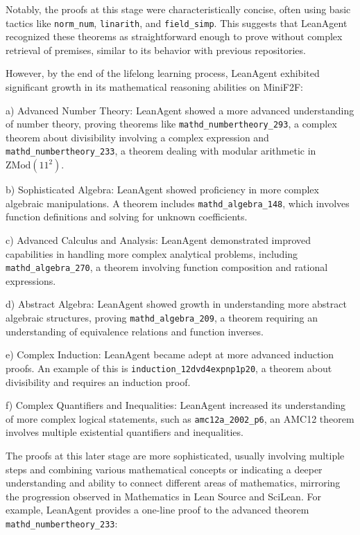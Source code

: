 \documentclass{article} %
\begin{document}
Notably, the proofs at this stage were characteristically concise, often using basic tactics like \texttt{norm\_num}, \texttt{linarith}, and \texttt{field\_simp}. This suggests that LeanAgent recognized these theorems as straightforward enough to prove without complex retrieval of premises, similar to its behavior with previous repositories.

However, by the end of the lifelong learning process, LeanAgent exhibited significant growth in its mathematical reasoning abilities on MiniF2F:

a) Advanced Number Theory:
LeanAgent showed a more advanced understanding of number theory, proving theorems like \texttt{mathd\_numbertheory\_293}, a complex theorem about divisibility involving a complex expression and \texttt{mathd\_numbertheory\_233}, a theorem dealing with modular arithmetic in $\text{ZMod}(11^2)$.

b) Sophisticated Algebra:
LeanAgent showed proficiency in more complex algebraic manipulations. A theorem includes \texttt{mathd\_algebra\_148}, which involves function definitions and solving for unknown coefficients.

c) Advanced Calculus and Analysis:
LeanAgent demonstrated improved capabilities in handling more complex analytical problems, including \texttt{mathd\_algebra\_270}, a theorem involving function composition and rational expressions.

d) Abstract Algebra:
LeanAgent showed growth in understanding more abstract algebraic structures, proving \texttt{mathd\_algebra\_209}, a theorem requiring an understanding of equivalence relations and function inverses.

e) Complex Induction:
LeanAgent became adept at more advanced induction proofs. An example of this is \texttt{induction\_12dvd4expnp1p20}, a theorem about divisibility and requires an induction proof.

f) Complex Quantifiers and Inequalities:
LeanAgent increased its understanding of more complex logical statements, such as \texttt{amc12a\_2002\_p6}, an AMC12 theorem involves multiple existential quantifiers and inequalities.


The proofs at this later stage are more sophisticated, usually involving multiple steps and combining various mathematical concepts or indicating a deeper understanding and ability to connect different areas of mathematics, mirroring the progression observed in Mathematics in Lean Source and SciLean. For example, LeanAgent provides a one-line proof to the advanced theorem \texttt{mathd\_numbertheory\_233}:
\end{document}
